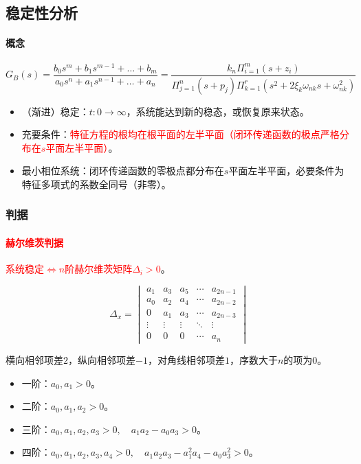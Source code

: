 \documentclass[
12pt, %
a4paper, 
oneside, %
]{scrartcl}
\begin{document}
\subsection[稳定性分析]{稳定性分析}
\paragraph{概念}
$$ G_B(s) = \frac{b_0 s^m + b_1 s^{m - 1} + \dots + b_m}{a_0 s^n + a_1 s^{n - 1} + \dots + a_n} = \frac{k_n \Pi_{i = 1}^m (s + z_i)}{\Pi_{j = 1}^n (s + p_j) \Pi_{k = 1}^r (s^2 + 2 \xi_k \omega_{nk} s + \omega_{nk}^2)} $$
\begin{itemize}
\item （渐进）稳定：$ t:0 \to \infty $，系统能达到新的稳态，或恢复原来状态。
\item 充要条件：\textcolor{red}{特征方程的根均在根平面的左半平面（闭环传递函数的极点严格分布在$ s $平面左半平面）}。
\item 最小相位系统：闭环传递函数的零极点都分布在$ s $平面左半平面，必要条件为特征多项式的系数全同号（非零）。
\end{itemize}
\subsubsection[判据]{判据}
\paragraph{\textcolor{red}{赫尔维茨判据}}
\textcolor{red}{系统稳定$ \Leftrightarrow $$ n $阶赫尔维茨矩阵$ \Delta_i > 0 $}。 \\
\begin{minipage}[t]{0.45\textwidth}
$$ \Delta_x = \begin{vmatrix} a_1 & a_3 & a_5 & \cdots & a_{2n - 1} \\ a_0 & a_2 & a_4 & \cdots & a_{2n - 2} \\ 0 & a_1 & a_3 & \cdots & a_{2n - 3} \\ \vdots & \vdots & \vdots & \ddots & \vdots \\ 0 & 0 & 0 & \cdots & a_n \end{vmatrix} $$

\hspace{2em}
横向相邻项差$ 2 $，纵向相邻项差$ -1 $，对角线相邻项差$ 1 $，序数大于$ n $的项为$ 0 $。
\end{minipage}
\begin{minipage}[t]{0.55\textwidth}
\begin{itemize}
\item 一阶：$ a_0, a_1 > 0 $。
\item 二阶：$ a_0, a_1, a_2 > 0 $。
\item 三阶：$ a_0, a_1, a_2, a_3 > 0, \quad a_1 a_2 - a_0 a_3 > 0 $。
\item 四阶：$ a_0, a_1, a_2, a_3, a_4 > 0, \quad a_1 a_2 a_3 - a_1^2 a_4 - a_0 a_3^2  > 0 $。
\end{itemize}
\end{minipage}
\end{document}
